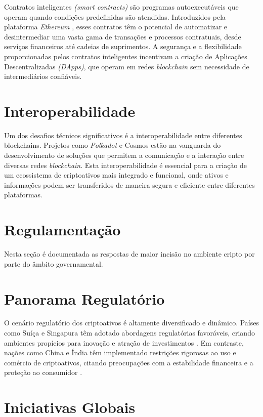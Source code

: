 Contratos inteligentes \textit{(smart contracts)} são programas autoexecutáveis que operam quando condições predefinidas são atendidas. Introduzidos pela plataforma \textit{Ethereum} \cite{buterin2013ethereum}, esses contratos têm o potencial de automatizar e desintermediar uma vasta gama de transações e processos contratuais, desde serviços financeiros até cadeias de suprimentos. A segurança e a flexibilidade proporcionadas pelos contratos inteligentes incentivam a criação de Aplicações Descentralizadas \textit{(DApps)}, que operam em redes \textit{blockchain} sem necessidade de intermediários confiáveis.

\section*{Interoperabilidade}

Um dos desafios técnicos significativos é a interoperabilidade entre diferentes blockchains. Projetos como \textit{Polkadot} \cite{wood2016polkadot} e Cosmos \cite{kwon2016cosmos} estão na vanguarda do desenvolvimento de soluções que permitem a comunicação e a interação entre diversas redes \textit{blockchain}. Esta interoperabilidade é essencial para a criação de um ecossistema de criptoativos mais integrado e funcional, onde ativos e informações podem ser transferidos de maneira segura e eficiente entre diferentes plataformas.

\section{Regulamentação}

Nesta seção é documentada as respostas de maior incisão no ambiente cripto por parte do âmbito governamental. 

\section*{Panorama Regulatório}

O cenário regulatório dos criptoativos é altamente diversificado e dinâmico. Países como Suíça e Singapura têm adotado abordagens regulatórias favoráveis, criando ambientes propícios para inovação e atração de investimentos \cite{zohar2015bitcoin}. Em contraste, nações como China e Índia têm implementado restrições rigorosas ao uso e comércio de criptoativos, citando preocupações com a estabilidade financeira e a proteção ao consumidor \cite{auer2018regulating}.

\section*{Iniciativas Globais}

